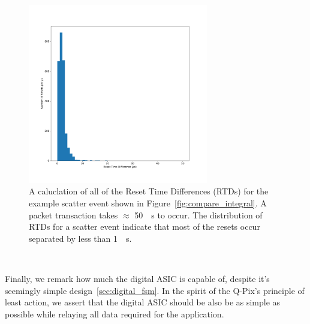 \begin{figure}[]
\centering
\includegraphics[width=0.7\textwidth]{images/example_rtd_scatter.pdf}
\caption{A caluclation of all of the Reset Time Differences (RTDs) for the example scatter event shown in Figure~\ref{fig:compare_integral}.
A packet transaction takes $\approx$ 50~\unit{\mu s} to occur.
The distribution of RTDs for a scatter event indicate that most of the resets occur separated by less than 1~\unit{\mu s}.
}
\end{figure}~\label{fig:example_rtd_scatter}

Finally, we remark how much the digital ASIC is capable of, despite it's seemingly simple design~\ref{sec:digital_fsm}.
In the spirit of the Q-Pix's principle of least action, we assert that the digital ASIC should be also be as simple as possible while relaying all data required for the application.
